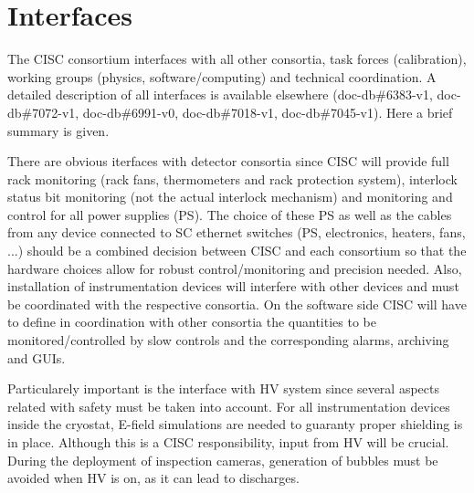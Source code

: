 \section{Interfaces}
\label{sec:fdgen-slow-cryo-intfc}


The CISC consortium interfaces with all other consortia, task forces (calibration), working groups (physics, software/computing) and technical coordination.  
A detailed description of all interfaces is available elsewhere (doc-db\#6383-v1, doc-db\#7072-v1, doc-db\#6991-v0, doc-db\#7018-v1, doc-db\#7045-v1).
Here a brief summary is given. 

There are obvious iterfaces with detector consortia since CISC will provide full rack monitoring (rack fans, thermometers and rack protection system),
interlock status bit monitoring (not the actual interlock mechanism) and monitoring and control for all power supplies (PS). The choice of these   
PS as well as the cables from any device connected to SC ethernet switches (PS, electronics, heaters, fans, ...)
should be a combined decision between CISC and each consortium so that the hardware choices allow for robust control/monitoring and precision needed.  
Also, installation of instrumentation devices will interfere with other devices and must be coordinated with the respective consortia.  
On the software side CISC will have to define in coordination with other consortia the quantities to be monitored/controlled by slow controls and the corresponding alarms,
archiving and GUIs. 



Particularely important is the interface with HV system since several aspects related with safety must be taken into account. 
For all instrumentation devices inside the cryostat, E-field simulations are needed to guaranty proper shielding is in place.
Although this is a CISC responsibility, input from HV will be crucial.
During the deployment of inspection cameras, generation of bubbles must be avoided when HV is on, as it can lead to discharges.

